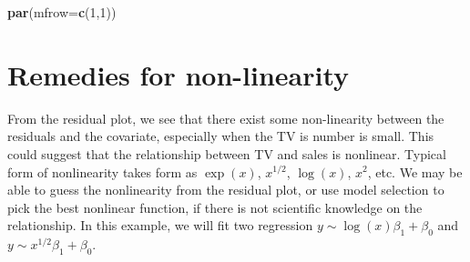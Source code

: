 \documentclass[12pt,]{book}
\newenvironment{Shaded}{\begin{snugshade}}{\end{snugshade}}
\newcommand{\KeywordTok}[1]{\textcolor[rgb]{0.13,0.29,0.53}{\textbf{#1}}}
\newcommand{\DataTypeTok}[1]{\textcolor[rgb]{0.13,0.29,0.53}{#1}}
\newcommand{\DecValTok}[1]{\textcolor[rgb]{0.00,0.00,0.81}{#1}}
\newcommand{\StringTok}[1]{\textcolor[rgb]{0.31,0.60,0.02}{#1}}
\newcommand{\OperatorTok}[1]{\textcolor[rgb]{0.81,0.36,0.00}{\textbf{#1}}}
\newcommand{\NormalTok}[1]{#1}
\begin{document}
\begin{Shaded}
\end{Shaded}

\begin{Shaded}
\begin{Highlighting}[]
\KeywordTok{par}\NormalTok{(}\DataTypeTok{mfrow=}\KeywordTok{c}\NormalTok{(}\DecValTok{1}\NormalTok{,}\DecValTok{1}\NormalTok{))}
\end{Highlighting}
\end{Shaded}

\section{Remedies for non-linearity}\label{remedies-for-non-linearity}

From the residual plot, we see that there exist some non-linearity
between the residuals and the covariate, especially when the TV is
number is small. This could suggest that the relationship between TV and
sales is nonlinear. Typical form of nonlinearity takes form as
\(\exp(x)\), \(x^{1/2}\), \(\log(x)\), \(x^2\), etc. We may be able to
guess the nonlinearity from the residual plot, or use model selection to
pick the best nonlinear function, if there is not scientific knowledge
on the relationship. In this example, we will fit two regression
\(y\sim \log(x)\beta_1 + \beta_0\) and
\(y \sim x^{1/2} \beta_1 + \beta_0\).
\end{document}
